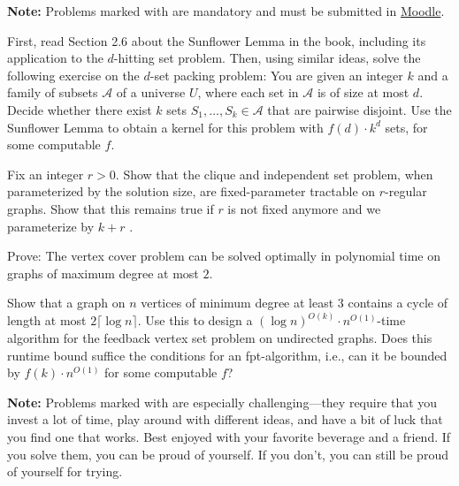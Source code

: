 \documentclass{uebung_cs}
\begin{document}
\textbf{Note:} Problems marked with \mandatory are mandatory and must be submitted in \href{https://moodle.studiumdigitale.uni-frankfurt.de/moodle/course/view.php?id=6259}{Moodle}.

\begin{exercise}
First, read Section 2.6 about the Sunflower Lemma in the book, including its application to the $d$-hitting set problem.
Then, using similar ideas, solve the following exercise on the $d$-set packing problem:
You are given an integer $k$ and a family of subsets $\mathcal{A}$ of a universe $U$, where each set in $\mathcal{A}$ is of size at most $d$. Decide whether there exist $k$ sets $S_1,\ldots,S_k \in \mathcal{A}$ that are pairwise disjoint.
Use the Sunflower Lemma to obtain a kernel for this problem with $f(d)\cdot k^d$ sets, for some computable $f$.
\end{exercise}

\begin{exercise}
Fix an integer $r > 0$. 
Show that the clique and independent set problem, when parameterized by the solution size, are fixed-parameter tractable on $r$-regular graphs.
Show that this remains true if $r$ is not fixed anymore and we parameterize by $k+r$ .
\end{exercise}

\begin{exercise}
Prove: The vertex cover problem can be solved optimally in polynomial time on graphs of maximum degree at most $2$.
\end{exercise}

\begin{exercise}
Show that a graph on $n$ vertices of minimum degree at least $3$ contains a cycle of length at most $2\lceil \log n\rceil$.
Use this to design a $(\log n)^{O(k)} \cdot  n^{O(1)}$-time algorithm for the feedback vertex set problem on undirected graphs.
Does this runtime bound suffice the conditions for an fpt-algorithm, i.e., can it be bounded by $f(k) \cdot n^{O(1)}$ for some computable $f$?
\end{exercise}

\textbf{Note:} Problems marked with \hard are especially challenging---they require that you invest a lot of time, play around with different ideas, and have a bit of luck that you find one that works. Best enjoyed with your favorite beverage and a friend. If you solve them, you can be proud of yourself. If you don't, you can still be proud of yourself for trying.
\end{document}
